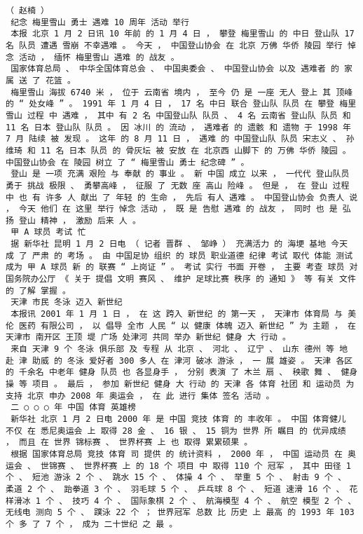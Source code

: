 \documentclass{article}
\begin{document}
\begin{Verbatim}[commandchars=\\\{\}]
 （ 赵楠 ） 
 纪念 梅里雪山 勇士 遇难 10 周年 活动 举行 
 本报 北京 1 月 2 日讯 10 年前 的 1 月 4 日 ， 攀登 梅里雪山 的 中日 登山队 17 名 队员 遭遇 雪崩 不幸遇难 。 今天 ， 中国登山协会 在 北京 万佛 华侨 陵园 举行 悼念 活动 ， 缅怀 梅里雪山 遇难 的 战友 。 
 国家体育总局 、 中华全国体育总会 、 中国奥委会 、 中国登山协会 以及 遇难者 的 家属 送 了 花篮 。 
 梅里雪山 海拔 6740 米 ， 位于 云南省 境内 ， 至今 仍 是 一座 无人 登上 其 顶峰 的 “ 处女峰 ” 。 1991 年 1 月 4 日 ， 17 名 中日 联合 登山队 队员 在 攀登 梅里雪山 过程 中 遇难 ， 其中 有 2 名 中国登山队 队员 、 4 名 云南省 登山队 队员 和 11 名 日本 登山队 队员 。 因 冰川 的 流动 ， 遇难者 的 遗骸 和 遗物 于 1998 年 7 月 陆续 被 发现 。 这年 的 8 月 11 日 ， 遇难 的 中国登山队 队员 宋志义 、 孙维琦 和 11 名 日本 队员 的 骨灰坛 被 安放 在 北京西 山脚下 的 万佛 华侨 陵园 。 中国登山协会 在 陵园 树立 了 “ 梅里雪山 勇士 纪念碑 ” 。 
 登山 是 一项 充满 艰险 与 奉献 的 事业 。 新 中国 成立 以来 ， 一代代 登山队员 勇于 挑战 极限 、 勇攀高峰 ， 征服 了 无数 座 高山 险峰 。 但是 ， 在 登山 过程 中 也 有 许多 人 献出 了 年轻 的 生命 ， 先后 有人 遇难 。 中国登山协会 负责人 说 ， 今天 他们 在 这里 举行 悼念 活动 ， 既 是 告慰 遇难 的 战友 ， 同时 也 是 弘扬 登山 精神 ， 激励 后来 人 。 
 甲 A 球员 考试 忙 
 据 新华社 昆明 1 月 2 日电 （ 记者 晋群 、 邹峥 ） 充满活力 的 海埂 基地 今天 成 了 严肃 的 考场 。 由 中国足协 组织 的 球员 职业道德 纪律 考试 取代 体能 测试 成为 甲 A 球员 新 的 联赛 “ 上岗证 ” 。 考试 实行 书面 开卷 ， 主要 考查 球员 对 国务院办公厅 《 关于 提倡 文明 赛风 、 维护 足球比赛 秩序 的 通知 》 等 有关 文件 的 了解 掌握 。 
 天津 市民 冬泳 迈入 新世纪 
 本报讯 2001 年 1 月 1 日 ， 在 这 跨入 新世纪 的 第一天 ， 天津市 体育局 与 美伦 医药 有限公司 ， 以 倡导 全市 人民 “ 以 健康 体魄 迈入 新世纪 ” 为 主题 ， 在 天津市 南开区 王顶 堤 广场 处津河 共同 举办 新世纪 健身 大 行动 。 
 来自 天津 9 个 冬泳 俱乐部 及 专程 从 北京 、 河北 、 辽宁 、 山东 德州 等 地 赴 津 助威 的 冬泳 爱好者 300 多人 在 津河 破冰 游泳 ， 一 展 雄姿 。 天津 各区 的 千余名 中老年 健身 队员 也 各显身手 ， 分别 表演 了 木兰 扇 、 秧歌 舞 、 健身操 等 项目 。 最后 ， 参加 新世纪 健身 大 行动 的 天津 各 体育 社团 和 运动员 为 支持 北京 申办 2008 年 奥运会 ， 在 此 进行 集体 签名 活动 。 
 二 ○ ○ ○ 年 中国 体育 英雄榜 
 新华社 北京 1 月 2 日电 2000 年 是 中国 竞技 体育 的 丰收年 。 中国 体育健儿 不仅 在 悉尼奥运会 上 取得 28 金 、 16 银 、 15 铜为 世界 所 瞩目 的 优异成绩 ， 而且 在 世界 锦标赛 、 世界杯赛 上 也 取得 累累硕果 。 
 根据 国家体育总局 竞技 体育 司 提供 的 统计资料 ， 2000 年 ， 中国 运动员 在 奥运会 、 世锦赛 、 世界杯赛 上 的 18 个 项目 中 取得 110 个 冠军 ， 其中 田径 1 个 、 短池 游泳 2 个 、 跳水 15 个 、 体操 4 个 、 举重 5 个 、 射击 9 个 、 柔道 2 个 、 跆拳道 3 个 、 羽毛球 5 个 、 乒乓球 8 个 、 短道 速滑 16 个 、 花样滑冰 1 个 、 技巧 4 个 、 国际象棋 2 个 、 航海模型 4 个 、 航空 模型 2 个 、 无线电 测向 5 个 、 蹼泳 22 个 ； 世界冠军 总数 比 历史 上 最高 的 1993 年 103 个 多 了 7 个 ， 成为 二十世纪 之 最 。 

\end{Verbatim}
\end{document}
